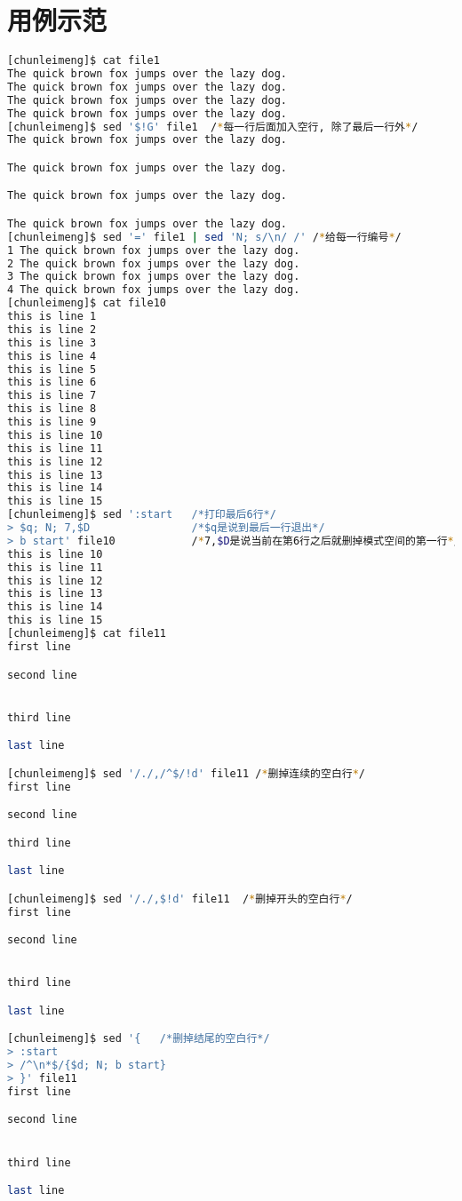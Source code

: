 \documentclass{article}
\begin{document}
\section{用例示范}
\begin{lstlisting}[language=bash, caption={Example}]
[chunleimeng]$ cat file1
The quick brown fox jumps over the lazy dog.
The quick brown fox jumps over the lazy dog.
The quick brown fox jumps over the lazy dog.
The quick brown fox jumps over the lazy dog.
[chunleimeng]$ sed '$!G' file1  /*每一行后面加入空行, 除了最后一行外*/
The quick brown fox jumps over the lazy dog.

The quick brown fox jumps over the lazy dog.

The quick brown fox jumps over the lazy dog.

The quick brown fox jumps over the lazy dog.
[chunleimeng]$ sed '=' file1 | sed 'N; s/\n/ /' /*给每一行编号*/
1 The quick brown fox jumps over the lazy dog.
2 The quick brown fox jumps over the lazy dog.
3 The quick brown fox jumps over the lazy dog.
4 The quick brown fox jumps over the lazy dog. 
[chunleimeng]$ cat file10
this is line 1
this is line 2
this is line 3
this is line 4
this is line 5
this is line 6
this is line 7
this is line 8
this is line 9
this is line 10
this is line 11
this is line 12
this is line 13
this is line 14
this is line 15
[chunleimeng]$ sed ':start   /*打印最后6行*/
> $q; N; 7,$D                /*$q是说到最后一行退出*/
> b start' file10            /*7,$D是说当前在第6行之后就删掉模式空间的第一行*/
this is line 10
this is line 11
this is line 12
this is line 13
this is line 14
this is line 15
[chunleimeng]$ cat file11
first line

second line


third line

last line

[chunleimeng]$ sed '/./,/^$/!d' file11 /*删掉连续的空白行*/
first line

second line

third line

last line

[chunleimeng]$ sed '/./,$!d' file11  /*删掉开头的空白行*/
first line

second line


third line

last line

[chunleimeng]$ sed '{   /*删掉结尾的空白行*/
> :start
> /^\n*$/{$d; N; b start}
> }' file11
first line

second line


third line

last line
\end{lstlisting}
\end{document}
